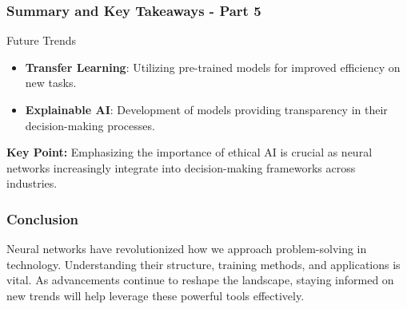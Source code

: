 \documentclass[aspectratio=169]{beamer}
\begin{document}
\begin{frame}[fragile]
  \frametitle{Summary and Key Takeaways - Part 5}
  \begin{block}{Future Trends}
    \begin{itemize}
      \item \textbf{Transfer Learning}: Utilizing pre-trained models for improved efficiency on new tasks.
      \item \textbf{Explainable AI}: Development of models providing transparency in their decision-making processes.
    \end{itemize}
    
    \textbf{Key Point:} Emphasizing the importance of ethical AI is crucial as neural networks increasingly integrate into decision-making frameworks across industries.
  \end{block}
\end{frame}

\begin{frame}[fragile]
  \frametitle{Conclusion}
  Neural networks have revolutionized how we approach problem-solving in technology. Understanding their structure, training methods, and applications is vital. As advancements continue to reshape the landscape, staying informed on new trends will help leverage these powerful tools effectively.
\end{frame}
\end{document}
